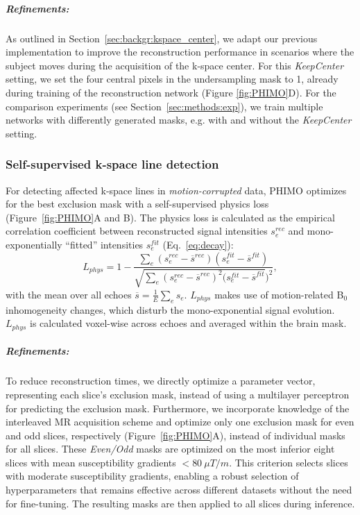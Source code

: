 \documentclass[AMA,STIX2COL]{MRM}
\begin{document}
\subparagraph{Refinements:} As outlined in Section~\ref{sec:backgr:kspace_center}, we adapt our previous implementation to improve the reconstruction performance in scenarios where the subject moves during the acquisition of the k-space center. For this \textit{KeepCenter} setting, we set the four central pixels in the undersampling mask to 1, already during training of the reconstruction network (Figure \ref{fig:PHIMO}D).
For the comparison experiments (see Section~\ref{sec:methods:exp}), we train multiple networks with differently generated masks, e.g. with and without the \textit{KeepCenter} setting.


\subsubsection{Self-supervised k-space line detection} \label{sec:methods:phimo:moco}
For detecting affected k-space lines in \textit{motion-corrupted} data, PHIMO optimizes for the best exclusion mask with a self-supervised physics loss\cite{Eichhorn_2024} (Figure~\ref{fig:PHIMO}A and B). The physics loss is calculated as the empirical correlation coefficient between reconstructed signal intensities $s_e^{rec}$ and mono-exponentially “fitted” intensities $s_e^{fit}$ (Eq.~\ref{eq:decay}):
%
\begin{equation}
L_{phys} = 1 - \frac{\sum_e (s_e^{rec} - \overline{s}^{rec}) (s_e^{fit} - \overline{s}^{fit})}
    {\sqrt{\sum_e (s_e^{rec} - \overline{s}^{rec})^2 (s_e^{fit} - \overline{s}^{fit}})^2},
\end{equation}
%
with the mean over all echoes $\overline{s} = \frac{1}{E} \sum_{e} s_e$. $L_{phys} $ makes use of motion-related B$_0$ inhomogeneity changes, which disturb the mono-exponential signal evolution. \cite{Noth_2014} $L_{phys}$ is calculated voxel-wise across echoes and averaged within the brain mask.

\subparagraph{Refinements:} To reduce reconstruction times, we directly optimize a parameter vector, representing each slice's exclusion mask, instead of using a multilayer perceptron for predicting the exclusion mask.\cite{Eichhorn_2024} Furthermore, we incorporate knowledge of the interleaved MR acquisition scheme and  optimize only one exclusion mask for even and odd slices, respectively (Figure~\ref{fig:PHIMO}A), instead of individual masks for all slices. These \textit{Even/Odd} masks are optimized on the most inferior eight slices with mean susceptibility gradients $<80~\mu T/m$. 
This criterion selects slices with moderate susceptibility gradients, enabling a robust selection of hyperparameters that remains effective across different datasets without the need for fine-tuning.
The resulting masks are then applied to all slices during inference.  
\end{document}
